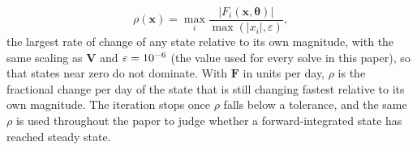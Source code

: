 \documentclass{article}
\begin{document}
\begin{equation}
  \rho(\mathbf{x}) = \max_i \frac{\lvert F_i(\mathbf{x},\boldsymbol{\theta})\rvert}{\max(\lvert x_i\rvert,\varepsilon)},
  \label{eq:scaled-residual}
\end{equation}
the largest rate of change of any state relative to its own magnitude, with the same scaling as \(\mathbf{V}\) and \(\varepsilon=10^{-6}\) (the value used for every solve in this paper), so that states near zero do not dominate. With \(\mathbf{F}\) in units per day, \(\rho\) is the fractional change per day of the state that is still changing fastest relative to its own magnitude. The iteration stops once \(\rho\) falls below a tolerance, and the same \(\rho\) is used throughout the paper to judge whether a forward-integrated state has reached steady state.
\end{document}
